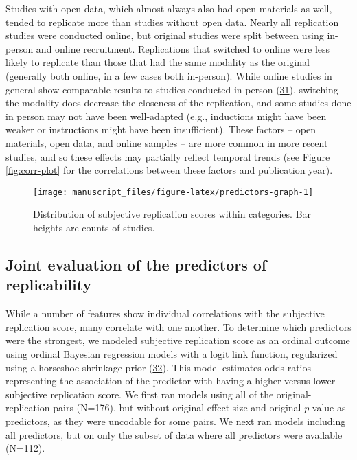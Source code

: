 \documentclass[
  english,
  a4paper,
]{article}
\begin{document}
Studies with open data, which almost always also had open materials as well, tended to replicate more than studies without open data. Nearly all replication studies were conducted online, but original studies were split between using in-person and online recruitment. Replications that switched to online were less likely to replicate than those that had the same modality as the original (generally both online, in a few cases both in-person). While online studies in general show comparable results to studies conducted in person (\protect\hyperlink{ref-crump2013}{31}), switching the modality does decrease the closeness of the replication, and some studies done in person may not have been well-adapted (e.g., inductions might have been weaker or instructions might have been insufficient). These factors -- open materials, open data, and online samples -- are more common in more recent studies, and so these effects may partially reflect temporal trends (see Figure \ref{fig:corr-plot} for the correlations between these factors and publication year).

\begin{figure}[ht]
\texttt{[image: manuscript\_files/figure-latex/predictors-graph-1]} \caption{Distribution of subjective replication scores within categories. Bar heights are counts of studies.}\label{fig:predictors-graph}
\end{figure}

\hypertarget{joint-evaluation-of-the-predictors-of-replicability}{%
\subsection{Joint evaluation of the predictors of replicability}\label{joint-evaluation-of-the-predictors-of-replicability}}

While a number of features show individual correlations with the subjective replication score, many correlate with one another. To determine which predictors were the strongest, we modeled subjective replication score as an ordinal outcome using ordinal Bayesian regression models with a logit link function, regularized using a horseshoe shrinkage prior (\protect\hyperlink{ref-carvalho09}{32}). This model estimates odds ratios representing the association of the predictor with having a higher versus lower subjective replication score. We first ran models using all of the original-replication pairs (N=176), but without original effect size and original \(p\) value as predictors, as they were uncodable for some pairs. We next ran models including all predictors, but on only the subset of data where all predictors were available (N=112).
\end{document}

